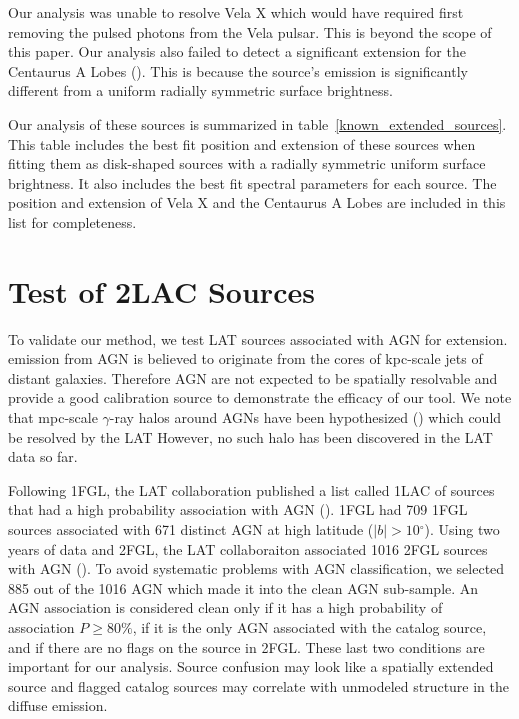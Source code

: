 \documentclass[12pt,preprint]{aastex}
\newcommand{\gev}{\text{GeV}\xspace}
\renewcommand{\deg}{\ensuremath{^\circ}\xspace}
\begin{document}
Our analysis was unable to resolve Vela X which would have required first
removing the pulsed photons from the Vela pulsar. This is beyond the
scope of this paper.  Our analysis also failed to detect a significant
extension for the Centaurus A Lobes (\cite{cen_a_lat}). This is because
the source's emission is significantly different from a uniform
radially symmetric surface brightness.

Our analysis of these sources is summarized in
table~\ref{known_extended_sources}.  This table includes the best fit
position and extension of these sources when fitting them as disk-shaped
sources with a radially symmetric uniform surface brightness. It also
includes the best fit spectral parameters for each source.  The position
and extension of Vela X and the Centaurus A Lobes are included in this
list for completeness.

\section{Test of 2LAC Sources}
\label{test_2lac_sources}

To validate our method, we test LAT sources associated with AGN for
extension.  \gev emission from AGN is believed to originate from the cores
of kpc-scale jets of distant galaxies.  Therefore AGN are not expected
to be spatially resolvable and provide a good calibration source to
demonstrate the efficacy of our tool.  We note that mpc-scale $\gamma$-ray
halos around AGNs have been hypothesized (\cite{pair_halo_paper}) which
could be resolved by the LAT However, no such halo has been discovered
in the LAT data so far.

Following 1FGL, the LAT collaboration published a list called 1LAC
of sources that
had a high probability association with AGN (\cite{first_agn_cat}).
1FGL had 709 1FGL sources associated with 671 distinct AGN at high
latitude ($|b|>10\deg$).  
Using two years of data and 2FGL, the LAT collaboraiton
associated 1016 2FGL sources
with AGN (\cite{second_agn_cat}).  
To avoid systematic problems with AGN classification, we
selected 885 out of the 1016 AGN which made it into the clean AGN sub-sample.  An AGN
association is considered clean only if it has a high probability
of association $P\ge 80\%$, if it is the only AGN associated with the
catalog source, and if there are no flags on the source in 2FGL. These
last two conditions are important for our analysis. Source
confusion may look like a spatially extended source and flagged catalog
sources may correlate with unmodeled structure in the diffuse emission.
\end{document}
